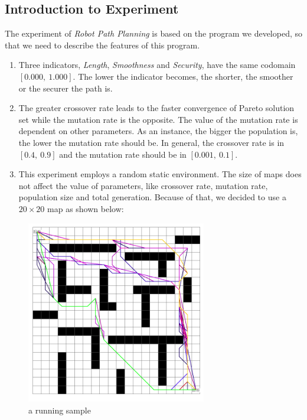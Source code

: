 \documentclass[a4paper, 11pt]{article}
\begin{document}
\subsection{Introduction to Experiment}
The experiment of \emph{Robot Path Planning} is based on the program we developed, so that we need to describe the features of this program.
\begin{enumerate}[~~1)~]
\item Three indicators, \emph{Length}, \emph{Smoothness} and \emph{Security}, have the same codomain $[0.000,\ 1.000]$. The lower the indicator becomes, the shorter, the smoother or the securer the path is.
\item The greater crossover rate leads to the faster convergence of Pareto solution set while the mutation rate is the opposite.
    The value of the mutation rate is dependent on other parameters. As an instance, the bigger the population is, the lower the mutation rate should be. In general, the crossover rate is in $[0.4,\ 0.9]$ and the mutation rate should be in $[0.001,\ 0.1]$.
\item This experiment employs a random static environment. The size of maps does not affect the value of parameters, like crossover rate, mutation rate, population size and total generation. Because of that, we decided to use a $20\times 20$ map as shown below:
\end{enumerate}
\begin{figure}[htb]
\centerline{\includegraphics[width=0.7\textwidth]{images/2020.png}}
\caption{a running sample}
\end{figure}
\end{document}
